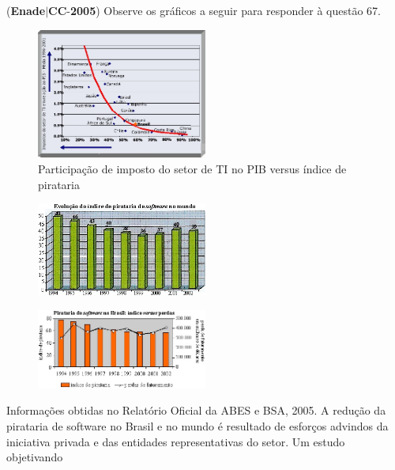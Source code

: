 \documentclass{exam}
\begin{document}
\begin{questions}
\question (\textbf{Enade}$|$\textbf{CC}-\textbf{2005}) Observe os gráficos a seguir para responder à questão 67.
\begin{figure}[H]
	\begin{center}
		\includegraphics[width=0.5\textwidth]{CIENCIA_DA_COMPUTACAO_Prova2005-utf8_figuras/fig-0033.jpg}
		\caption{Participação de imposto do setor de TI no PIB versus índice de pirataria}
	\end{center}
\end{figure}
\begin{figure}[H]
	\begin{center}
		\includegraphics[width=0.5\textwidth]{CIENCIA_DA_COMPUTACAO_Prova2005-utf8_figuras/fig-0031.jpg}
	\end{center}
\end{figure}
\begin{figure}[H]
	\begin{center}
		\includegraphics[width=0.5\textwidth]{CIENCIA_DA_COMPUTACAO_Prova2005-utf8_figuras/fig-0032.jpg}
	\end{center}
\end{figure}
Informações obtidas no Relatório Oficial da ABES e BSA, 2005.
A redução da pirataria de software no Brasil e no mundo
é resultado de esforços advindos da iniciativa privada e das
entidades representativas do setor. Um estudo objetivando

\end{questions}
\end{document}
